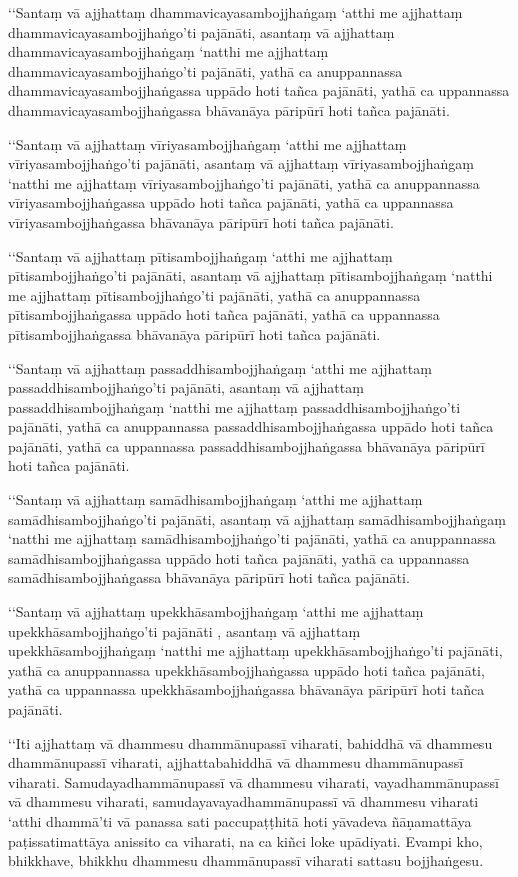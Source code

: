 ‘‘Santaṃ vā ajjhattaṃ dhammavicayasambojjhaṅgaṃ ‘atthi me ajjhattaṃ dhammavicayasambojjhaṅgo’ti pajānāti, asantaṃ vā ajjhattaṃ dhammavicayasambojjhaṅgaṃ ‘natthi me ajjhattaṃ dhammavicayasambojjhaṅgo’ti pajānāti, yathā ca anuppannassa dhammavicayasambojjhaṅgassa uppādo hoti tañca pajānāti, yathā ca uppannassa dhammavicayasambojjhaṅgassa bhāvanāya pāripūrī hoti tañca pajānāti.

‘‘Santaṃ vā ajjhattaṃ vīriyasambojjhaṅgaṃ ‘atthi me ajjhattaṃ vīriyasambojjhaṅgo’ti pajānāti, asantaṃ vā ajjhattaṃ vīriyasambojjhaṅgaṃ ‘natthi me ajjhattaṃ vīriyasambojjhaṅgo’ti pajānāti, yathā ca anuppannassa vīriyasambojjhaṅgassa uppādo hoti tañca pajānāti, yathā ca uppannassa vīriyasambojjhaṅgassa bhāvanāya pāripūrī hoti tañca pajānāti.

‘‘Santaṃ vā ajjhattaṃ pītisambojjhaṅgaṃ ‘atthi me ajjhattaṃ pītisambojjhaṅgo’ti pajānāti, asantaṃ vā ajjhattaṃ pītisambojjhaṅgaṃ ‘natthi me ajjhattaṃ pītisambojjhaṅgo’ti pajānāti, yathā ca anuppannassa pītisambojjhaṅgassa uppādo hoti tañca pajānāti, yathā ca uppannassa pītisambojjhaṅgassa bhāvanāya pāripūrī hoti tañca pajānāti.

‘‘Santaṃ vā ajjhattaṃ passaddhisambojjhaṅgaṃ ‘atthi me ajjhattaṃ passaddhisambojjhaṅgo’ti pajānāti, asantaṃ vā ajjhattaṃ passaddhisambojjhaṅgaṃ ‘natthi me ajjhattaṃ passaddhisambojjhaṅgo’ti pajānāti, yathā ca anuppannassa passaddhisambojjhaṅgassa uppādo hoti tañca pajānāti, yathā ca uppannassa passaddhisambojjhaṅgassa bhāvanāya pāripūrī hoti tañca pajānāti.

‘‘Santaṃ vā ajjhattaṃ samādhisambojjhaṅgaṃ ‘atthi me ajjhattaṃ samādhisambojjhaṅgo’ti pajānāti, asantaṃ vā ajjhattaṃ samādhisambojjhaṅgaṃ ‘natthi me ajjhattaṃ samādhisambojjhaṅgo’ti pajānāti, yathā ca anuppannassa samādhisambojjhaṅgassa uppādo hoti tañca pajānāti, yathā ca uppannassa samādhisambojjhaṅgassa bhāvanāya pāripūrī hoti tañca pajānāti.

‘‘Santaṃ vā ajjhattaṃ upekkhāsambojjhaṅgaṃ ‘atthi me ajjhattaṃ upekkhāsambojjhaṅgo’ti pajānāti , asantaṃ vā ajjhattaṃ upekkhāsambojjhaṅgaṃ ‘natthi me ajjhattaṃ upekkhāsambojjhaṅgo’ti pajānāti, yathā ca anuppannassa upekkhāsambojjhaṅgassa uppādo hoti tañca pajānāti, yathā ca uppannassa upekkhāsambojjhaṅgassa bhāvanāya pāripūrī hoti tañca pajānāti.

‘‘Iti ajjhattaṃ vā dhammesu dhammānupassī viharati, bahiddhā vā dhammesu dhammānupassī viharati, ajjhattabahiddhā vā dhammesu dhammānupassī viharati. Samudayadhammānupassī vā dhammesu viharati, vayadhammānupassī vā dhammesu viharati, samudayavayadhammānupassī vā dhammesu viharati ‘atthi dhammā’ti vā panassa sati paccupaṭṭhitā hoti yāvadeva ñāṇamattāya paṭissatimattāya anissito ca viharati, na ca kiñci loke upādiyati. Evampi kho, bhikkhave, bhikkhu dhammesu dhammānupassī viharati sattasu bojjhaṅgesu.

